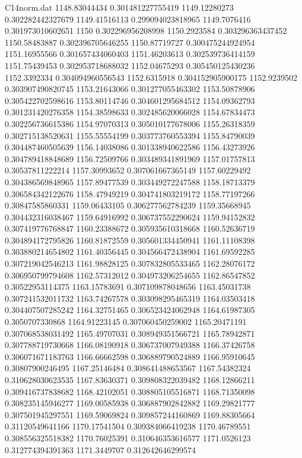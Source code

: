 \begin{filecontents}{C14norm.dat}
1148.83044434			0.301481227755419
1149.12280273			0.302282442327679
1149.41516113			0.299094023818965
1149.7076416			0.301973010602651
1150			0.302296956208998
1150.2923584			0.303296363437452
1150.58483887			0.302396705646255
1150.87719727			0.300475244924954
1151.16955566			0.301657434060403
1151.46203613			0.302539736414159
1151.75439453			0.302953718688032
1152.04675293			0.305450125430236
1152.3392334			0.304094960556543
1152.6315918			0.304152905900175
1152.9239502			0.303907490820745
1153.21643066			0.301277055463302
1153.50878906			0.305422702598616
1153.80114746			0.304601295684512
1154.09362793			0.301231420276358
1154.38598633			0.302485620066028
1154.67834473			0.302256736615386
1154.97070313			0.305010177678006
1155.26318359			0.302715138520631
1155.55554199			0.303773760553394
1155.84790039			0.304487460505639
1156.14038086			0.301338940622586
1156.43273926			0.304789418848689
1156.72509766			0.303489341891969
1157.01757813			0.30537811222214
1157.30993652			0.307061667365149
1157.60229492			0.304386569848965
1157.89477539			0.303449272247588
1158.18713379			0.306584342122676
1158.47949219			0.304741803219172
1158.77197266			0.30847585860331
1159.06433105			0.306277562784239
1159.35668945			0.304432316038467
1159.64916992			0.306737552290624
1159.94152832			0.307419776768847
1160.23388672			0.305935610318668
1160.52636719			0.304894172795826
1160.81872559			0.305601334450941
1161.11108398			0.303880214654802
1161.40356445			0.304566472438904
1161.69592285			0.307219042546213
1161.98828125			0.307832805533465
1162.28076172			0.306950799794608
1162.57312012			0.304973206254655
1162.86547852			0.30522953114375
1163.15783691			0.307109878048656
1163.45031738			0.307241532011732
1163.74267578			0.303098295465319
1164.03503418			0.304407507285242
1164.32751465			0.306523424062948
1164.61987305			0.3050707330868
1164.91223145			0.307060450259002
1165.20471191			0.307068538031492
1165.49707031			0.308949351566721
1165.78942871			0.307788719730668
1166.08190918			0.306737007949388
1166.37426758			0.306071671183763
1166.66662598			0.306889790524889
1166.95910645			0.30807900246495
1167.25146484			0.308641488653567
1167.54382324			0.310628030623535
1167.83630371			0.309808322039482
1168.12866211			0.309416737838682
1168.42102051			0.308805105516871
1168.71350098			0.308235145946277
1169.00585938			0.306887902842882
1169.29821777			0.307501945297551
1169.59069824			0.309857244160869
1169.88305664			0.31120549641166
1170.17541504			0.309384066419238
1170.46789551			0.308556325518382
1170.76025391			0.310646353616577
1171.0526123			0.312774394391363
1171.3449707			0.312642646299574

\end{filecontents}
